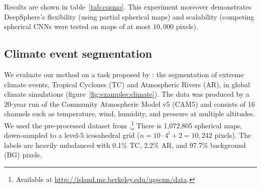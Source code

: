 \documentclass{article} %
\newcommand{\todo}[1]{{\color[rgb]{.6,.1,.6}{#1}}}
\renewcommand{\figref}[1]{figure~\ref{fig:#1}}
\newcommand{\tabref}[1]{table~\ref{tab:#1}}
\begin{document}
\todo{
}

Results are shown in \tabref{cosmo}.
\todo{
	While extreme non-equivariance (the 2D CNN baseline) penalizes performance, better equivariance doesn't improve performance.
	It might be that the lack of built-in equivariance is compensated by learned equivariance (as done when augmenting data during training).}
\todo{
	Alternative: DSv2 better than v1 -> equivariance has practical implications.
	Clear cost-accuracy tradeoff with the number of neighbors.
}
This experiment moreover demonstrates DeepSphere's flexibility (using partial spherical maps) and scalability (competing spherical CNNs were tested on maps of at most $10,000$ pixels).

\subsection{Climate event segmentation} \label{sec:exp:climate}

We evaluate our method on a task proposed by \citep{mudigonda2017climateevents}: the segmentation of extreme climate events, Tropical Cyclones (TC) and Atmospheric Rivers (AR), in global climate simulations (\figref{examples:climate}).
The data was produced by a 20-year run of the Community Atmospheric Model v5 (CAM5) and consists of 16 channels such as temperature, wind, humidity, and pressure at multiple altitudes.
We used the pre-processed dataset from \citep{jiang2019sphericalcnn}.\footnote{Available at \url{http://island.me.berkeley.edu/ugscnn/data}.}
There is 1,072,805 spherical maps, down-sampled to a level-5 icosahedral grid ($n = 10 \cdot 4^l + 2 = 10,242$ pixels).
The labels are heavily unbalanced with 0.1\% TC, 2.2\% AR, and 97.7\% background (BG) pixels.

\todo{Graph (\#neighbors), network architecture (info in the appendix, set the notation in the method section), loss, hyper-parameters. Or leave in appendix.}
\end{document}
